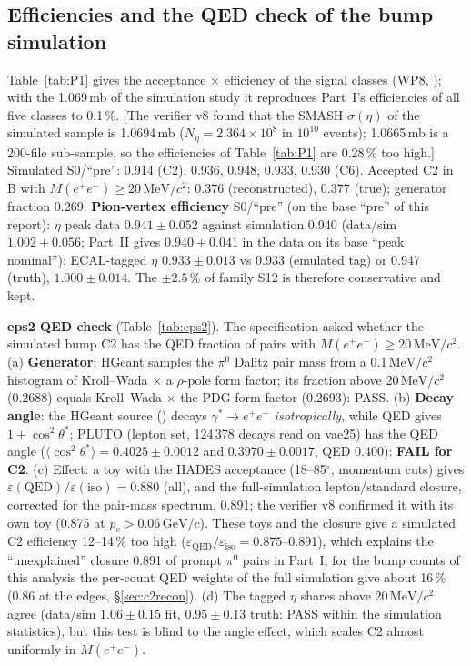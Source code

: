 \documentclass[11pt,a4paper]{article}
\newcommand{\piz}{\ensuremath{\pi^{0}}\xspace}
\newcommand{\ee}{\ensuremath{e^{+}e^{-}}\xspace}
\newcommand{\Mee}{\ensuremath{M(e^{+}e^{-})}\xspace}
\newcommand{\GeVc}{\ensuremath{\mathrm{GeV}/c}\xspace}
\newcommand{\MeVcc}{\ensuremath{\mathrm{MeV}/c^{2}}\xspace}
\newcommand{\code}[1]{\texttt{\detokenize{#1}}}
\newcommand{\flag}[1]{\textcolor{red!60!black}{[#1]}}
\newcommand{\tabin}[1]{}
\begin{document}
\subsection{Efficiencies and the QED check of the bump simulation}
\label{sec:eff}
\tabin{wp8_tableP1.tex}

Table~\ref{tab:P1} gives the acceptance $\times$ efficiency of the signal classes (WP8, \code{wp8_sim.C}); with the 1.069\,mb of the
simulation study it reproduces Part~I's efficiencies of all five classes to 0.1\,\%. \flag{The verifier v8 found that the SMASH
$\sigma(\eta)$ of the simulated sample is 1.0694\,mb ($N_\eta=2.364\times10^8$ in $10^{10}$ events); 1.0665\,mb is a 200-file sub-sample, so the
efficiencies of Table~\ref{tab:P1} are 0.28\,\% too high.} Simulated S0/``pre'': 0.914 (C2), 0.936, 0.948, 0.933, 0.930 (C6). Accepted C2 in
B with \Mee$\ge20$\,\MeVcc: 0.376 (reconstructed), 0.377 (true); generator fraction 0.269. \textbf{Pion-vertex efficiency} S0/``pre'' (on the base
``pre'' of this report): $\eta$ peak data $0.941\pm0.052$ against simulation 0.940 (data/sim $1.002\pm0.056$; Part~II gives $0.940\pm0.041$ in the
data on its base ``peak nominal''); ECAL-tagged $\eta$ $0.933\pm0.013$ vs 0.933 (emulated tag)
or 0.947 (truth), $1.000\pm0.014$. The $\pm2.5$\,\% of family S12 is therefore conservative and kept.

\textbf{eps2 QED check} (Table~\ref{tab:eps2}). The specification asked whether the simulated bump C2 has the QED fraction of pairs with
\Mee$\ge20$\,\MeVcc. (a) \textbf{Generator}: HGeant samples the \piz Dalitz pair mass from a 0.1\,\MeVcc histogram of Kroll--Wada $\times$
a $\rho$-pole form factor; its fraction above 20\,\MeVcc (0.2688) equals Kroll--Wada $\times$ the PDG form factor (0.2693): PASS. (b)
\textbf{Decay angle}: the HGeant source (\code{gdalet.F}) decays $\gamma^*\to\ee$ \emph{isotropically}, while QED gives $1+\cos^2\theta^*$;
PLUTO (lepton set, 124\,378 decays read on vae25) has the QED angle ($\langle\cos^2\theta^*\rangle=0.4025\pm0.0012$ and $0.3970\pm0.0017$,
QED 0.400): \textbf{FAIL for C2}. (c) Effect: a toy with the HADES acceptance (18--85$^\circ$, momentum cuts) gives
$\varepsilon(\mathrm{QED})/\varepsilon(\mathrm{iso})=0.880$ (all), and the full-simulation lepton/standard closure, corrected for the pair-mass
spectrum, 0.891; the verifier v8 confirmed it with its own toy (0.875 at $p_e>0.06$\,\GeVc). These toys and the closure give
a simulated C2 efficiency 12--14\,\% too high ($\varepsilon_{\mathrm{QED}}/\varepsilon_{\mathrm{iso}}=0.875$--0.891), which explains the ``unexplained'' closure 0.891 of prompt \piz pairs in Part~I; for the bump counts of this analysis the per-count QED weights of the full simulation give about 16\,\% (0.86 at the edges, \S\ref{sec:c2recon}). (d) The tagged $\eta$ shares above 20\,\MeVcc agree
(data/sim $1.06\pm0.15$ fit, $0.95\pm0.13$ truth: PASS within the simulation statistics), but this test is blind to the angle effect, which
scales C2 almost uniformly in \Mee.
\end{document}
